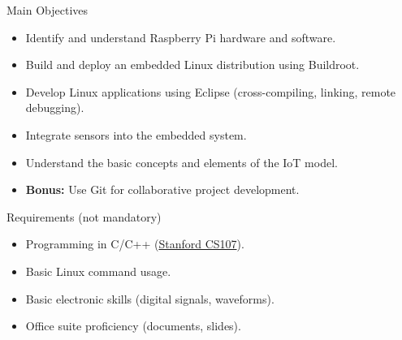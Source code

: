 
\begin{frame}{Main Objectives}
  \begin{itemize}
    \item Identify and understand Raspberry Pi hardware and software.
    \item Build and deploy an embedded Linux distribution using Buildroot.
    \item Develop Linux applications using Eclipse (cross-compiling, linking, remote debugging).
    \item Integrate sensors into the embedded system.
    \item Understand the basic concepts and elements of the IoT model.
    \item \textbf{Bonus:} Use Git for collaborative project development.
  \end{itemize}
\end{frame}


\begin{frame}{Requirements (not mandatory)}
  \begin{itemize}
    \item Programming in C/C++ (\href{https://web.stanford.edu/class/cs107/}{Stanford CS107}).
    \item Basic Linux command usage.
    \item Basic electronic skills (digital signals, waveforms).
    \item Office suite proficiency (documents, slides).
  \end{itemize}
\end{frame}

